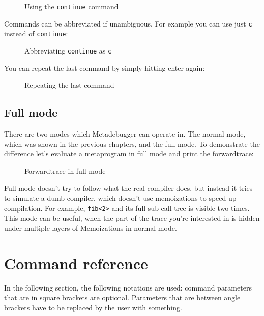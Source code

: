 \noindent
\begin{figure}[H]
    
    \caption{Using the \texttt{continue} command}
\end{figure}

\noindent
Commands can be abbreviated if unambiguous. For example you can use just
\texttt{c} instead of \texttt{continue}:

\begin{figure}[H]
    
    \caption{Abbreviating \texttt{continue} as \texttt{c}}
\end{figure}

\noindent
You can repeat the last command by simply hitting enter again:

\begin{figure}[H]
    
    \caption{Repeating the last command}
\end{figure}

\subsection{Full mode}

There are two modes which Metadebugger can operate in. The normal mode, which
was shown in the previous chapters, and the full mode. To demonstrate the
difference let's evaluate a metaprogram in full mode and print the
forwardtrace:

\begin{figure}[H]
    
    \caption{Forwardtrace in full mode}
\end{figure}

Full mode doesn't try to follow what the real compiler does, but instead it
tries to simulate a dumb compiler, which doesn't use memoizations to speed up
compilation. For example, \texttt{fib<2>} and its full sub call tree is
visible two times. This mode can be useful, when the part of the trace you're
interested in is hidden under multiple layers of Memoizations in normal mode.

\section{Command reference}

In the following section, the following notations are used: command parameters
that are in square brackets are optional. Parameters that are between angle
brackets have to be replaced by the user with something.



